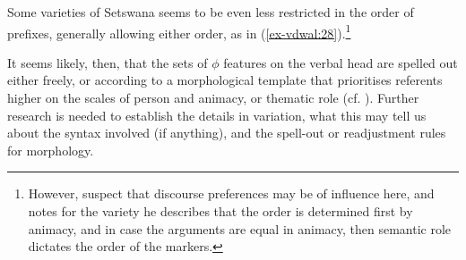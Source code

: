 \documentclass[output=paper
,modfonts
,nonflat]{langsci/langscibook}
\begin{document}
Some varieties of Setswana seems to be even less restricted in the order of prefixes, generally allowing either order, as in (\ref{ex-vdwal:28}).\footnote{However, \citet{Pretorius_et_al2012} suspect that discourse preferences may be of influence here, and \citet{Creissels2002} notes for the variety he describes that the order is determined first by animacy, and in case the arguments are equal in animacy, then semantic role dictates the order of the markers.} 

It seems likely, then, that the sets of $\phi$ features on the verbal head are spelled out either freely, or according to a morphological template that prioritises referents higher on the scales of person and animacy, or thematic role (cf. \citealt{Duranti1979}). Further research is needed to establish the details in variation, what this may tell us about the syntax involved (if anything), and the spell-out or readjustment rules for morphology.
\end{document}
